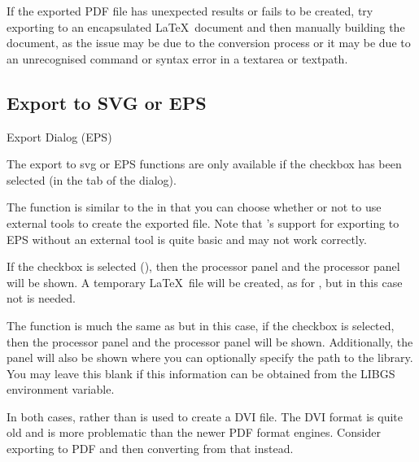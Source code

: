 If the exported PDF file has unexpected results or fails to be
created, try exporting to an encapsulated \LaTeX\ document and then
manually building the document, as the issue may be due to the
conversion process or it may be due to an unrecognised command or
syntax error in a \gls{textarea} or \gls{textpath}.


\subsection{Export to SVG or EPS}\label{sec:exportsvgeps}

 {}
 {Export Dialog (EPS)}

The export to \gls{svg} or EPS functions are only available if the
 checkbox has been selected
(in the  tab of the  dialog).


The  function is similar to the 
in that you can choose whether or not to use external tools to
create the exported file. Note that \FlowframTk's support for
exporting to EPS without an external tool is quite basic and may not
work correctly.

If the  checkbox is
selected (), then the
 processor panel and the
 processor panel will be shown.
A temporary \LaTeX\ file will be created, as for
, but in this case  not
 is needed.


The  function is much the same as
 but in this case, if the   checkbox is
selected, then the 
 processor panel and the
 processor panel will be shown.
Additionally, the  panel will also be shown
where you can optionally specify the path to the 
library. You may leave this blank if this information can be
obtained from the \gls{LIBGS} environment variable.

\begin{warning}
In both cases,  rather than  is used to
create a DVI file. The DVI format is quite old and is more
problematic than the newer PDF format engines. Consider exporting to
PDF and then converting from that instead.
\end{warning}

